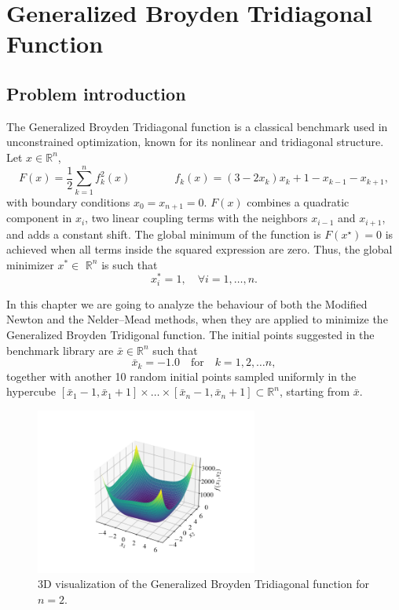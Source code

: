 \documentclass[a4paper,12pt]{article}
\begin{document}
	\section{Generalized Broyden Tridiagonal Function}
	\subsection{Problem introduction}
	The Generalized Broyden Tridiagonal function is a classical benchmark used in unconstrained optimization, known for its nonlinear and tridiagonal structure. Let \( x \in \mathbb{R}^{n} \),
	\begin{equation}
		F(x) = \frac{1}{2} \sum_{k=1}^{n} f_k^2(x)
		\qquad\qquad
		f_k(x) = (3 - 2x_k)x_k + 1 - x_{k-1} - x_{k+1},
	\end{equation}
	with boundary conditions \( x_0 = x_{n+1} = 0 \). 
	$F(x)$ combines a quadratic component in \( x_i \), two linear coupling terms with the neighbors \( x_{i-1} \) and \( x_{i+1} \), and adds a constant shift. The global minimum of the function is \( F(x^\star) = 0 \) is achieved when all terms inside the squared expression are zero. Thus, the global minimizer $x^{*} \in$ $\mathbb{R}^{n}$ is such that
	\[
	x_i^{*} = 1, \quad \forall i  = 1,\dots,n.
	\]
	
	\noindent In this chapter we are going to analyze the behaviour of both the Modified Newton and the Nelder–Mead methods, when they are applied to minimize the Generalized Broyden Tridigonal function. 
	The initial points suggested in the benchmark library  are $\bar{x} \in \mathbb{R}^{n}$ such that
	\[
	\bar{x}_{k} = -1.0 \quad \text{for} \quad k = 1,2,\dots n, 		
	\]
	together with another 10 random initial points sampled uniformly in the hypercube $[\bar{x}_{1}-1,\bar{x}_{1}+1]\times\dots\times[\bar{x}_{n}-1,\bar{x}_{n}+1] \subset \mathbb{R}^{n}$, starting from $\bar{x}$.
	
	\begin{figure}[H]
		\centering
		\includegraphics[width=0.65\textwidth]{../immagini/broyden.png}
		\caption{3D visualization of the Generalized Broyden Tridiagonal function for $n=2$.}
		\label{fig:broyden3D}
	\end{figure}
	
\end{document}
